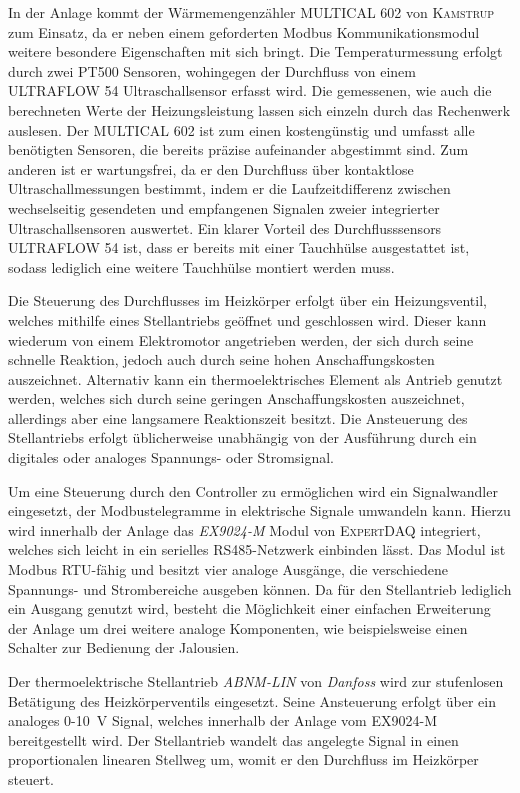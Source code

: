 In der Anlage kommt der Wärmemengenzähler \textsc{MULTICAL 602} von \textsc{Kamstrup} zum Einsatz, da er neben einem geforderten Modbus Kommunikationsmodul weitere besondere Eigenschaften mit sich bringt. Die Temperaturmessung erfolgt durch zwei PT500 Sensoren, wohingegen der Durchfluss von einem \textsc{ULTRAFLOW 54} Ultraschallsensor erfasst wird. Die gemessenen, wie auch die berechneten Werte der Heizungsleistung lassen sich einzeln durch das Rechenwerk auslesen.
Der \textsc{MULTICAL 602} ist zum einen kostengünstig und umfasst alle benötigten Sensoren, die bereits präzise aufeinander abgestimmt sind. Zum anderen ist er wartungsfrei, da er den Durchfluss über kontaktlose Ultraschallmessungen bestimmt, indem er die Laufzeitdifferenz zwischen wechselseitig gesendeten und empfangenen Signalen zweier integrierter Ultraschallsensoren auswertet. Ein klarer Vorteil des Durchflusssensors \textsc{ULTRAFLOW 54} ist, dass er bereits mit einer Tauchhülse ausgestattet ist, sodass lediglich eine weitere Tauchhülse montiert werden muss.


Die Steuerung des Durchflusses im Heizkörper erfolgt über ein Heizungsventil, welches mithilfe eines Stellantriebs geöffnet und geschlossen wird. Dieser kann wiederum von einem Elektromotor angetrieben werden, der sich durch seine schnelle Reaktion, jedoch auch durch seine hohen Anschaffungskosten auszeichnet. Alternativ kann ein thermoelektrisches Element als Antrieb genutzt werden, welches sich durch seine geringen Anschaffungskosten auszeichnet, allerdings aber eine langsamere Reaktionszeit besitzt. Die Ansteuerung des Stellantriebs erfolgt üblicherweise unabhängig von der Ausführung durch ein digitales oder analoges Spannungs- oder Stromsignal.

Um eine Steuerung durch den Controller zu ermöglichen wird ein Signalwandler eingesetzt, der Modbustelegramme in elektrische Signale umwandeln kann. Hierzu wird innerhalb der Anlage das \textit{EX9024-M} Modul von \textsc{ExpertDAQ} integriert, welches sich leicht in ein serielles RS485-Netzwerk einbinden lässt. Das Modul ist Modbus RTU-fähig und besitzt vier analoge Ausgänge, die verschiedene Spannungs- und Strombereiche ausgeben können. Da für den Stellantrieb lediglich ein Ausgang genutzt wird, besteht die Möglichkeit einer einfachen Erweiterung der Anlage um drei weitere analoge Komponenten, wie beispielsweise einen Schalter zur Bedienung der Jalousien.

Der thermoelektrische Stellantrieb \textit{ABNM-LIN} von \textit{Danfoss} wird zur stufenlosen Betätigung des Heizkörperventils eingesetzt. Seine Ansteuerung erfolgt über ein analoges 0-10~V Signal, welches innerhalb der Anlage vom EX9024-M bereitgestellt wird. Der Stellantrieb wandelt das angelegte Signal in einen proportionalen linearen Stellweg um, womit er den Durchfluss im Heizkörper steuert.



